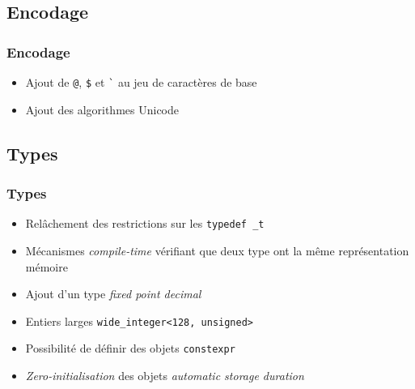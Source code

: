 \documentclass[C++.tex]{subfiles}
\begin{document}
\subsection*{Encodage}
\begin{frame}[fragile]
	\frametitle{Encodage}
	\begin{itemize}
		\item Ajout de \lstinline|@|, \lstinline|$| et \lstinline|`| au jeu de caractères de base


		\item Ajout des algorithmes Unicode

	\end{itemize}
\end{frame}

\subsection*{Types}
\begin{frame}[fragile]
	\frametitle{Types}
	\begin{itemize}
		\item Relâchement des restrictions sur les \lstinline|typedef _t|
		\item Mécanismes \textit{compile-time} vérifiant que deux type ont la même représentation mémoire


		\item Ajout d'un type \og{}\textit{fixed point decimal}\fg{}
		\item Entiers larges \lstinline|wide_integer<128, unsigned>|
		\item Possibilité de définir des objets \lstinline|constexpr|
		\item \textit{Zero-initialisation} des objets \textit{automatic storage duration}

	\end{itemize}
\end{frame}
\end{document}
